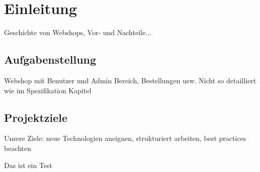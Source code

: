 \section{Einleitung}
Geschichte von Webshops, Vor- und Nachteile...

\subsection{Aufgabenstellung}
Webshop mit Benutzer und Admin Bereich, Bestellungen usw. Nicht so detailliert wie im Spezifikation Kapitel

\subsection{Projektziele}
Unsere Ziele: neue Technologien aneignen, strukturiert arbeiten, best practices beachten

Das ist ein Test
